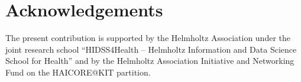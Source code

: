 \documentclass[runningheads]{llncs}
\begin{document}
 \section{Acknowledgements}
The present contribution is supported by the Helmholtz Association under the joint research school “HIDSS4Health – Helmholtz Information and Data Science School for Health” and by the Helmholtz Association Initiative and
Networking Fund on the HAICORE@KIT partition. 

\end{document}
